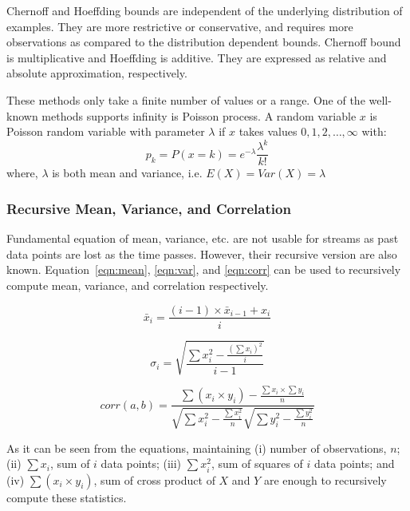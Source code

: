\documentclass[a4paper, 11pt, oneside]{book}
\begin{document}
Chernoff and Hoeffding bounds are independent of the underlying distribution of examples. They are more restrictive or conservative, and requires more observations as compared to the distribution dependent bounds. Chernoff bound is multiplicative and Hoeffding is additive. They are expressed as relative and absolute approximation, respectively.

These methods only take a finite number of values or a range. One of the well-known methods supports infinity is Poisson process. A random variable $x$ is Poisson random variable with parameter $\lambda$ if $x$ takes values $0,1,2, \dots, \infty$ with:
    \[
        p_k = P(x=k) = e^{-\lambda} \frac{\lambda^k}{k!}
    \]
    where, $\lambda$ is both mean and variance, i.e. $E(X) = Var(X) = \lambda$
    
\subsubsection{Recursive Mean, Variance, and Correlation}
Fundamental equation of mean, variance, etc. are not usable for streams as past data points are lost as the time passes. However, their recursive version are also known. Equation~\ref{eqn:mean}, \ref{eqn:var}, and \ref{eqn:corr} can be used to recursively compute mean, variance, and correlation respectively.

\begin{equation}
\label{eqn:mean}
    \bar{x}_i = \frac{(i-1) \times \bar{x}_{i-1} + x_i}{i}
\end{equation}

\begin{equation}
\label{eqn:var}
    \sigma_i = \sqrt{ \frac{\sum x_i^2 - \frac{ (\sum x_i )^2}{i} }{i-1} }
\end{equation}

\begin{equation}
\label{eqn:corr}
    corr(a, b) = \frac{ \sum(x_i \times y_i) - \frac{\sum x_i \times \sum y_i}{n} }{\sqrt{\sum x_i^2 - \frac{\sum x_i^2}{n}} \sqrt{\sum y_i^2 - \frac{\sum y_i^2}{n}}}
\end{equation}

As it can be seen from the equations, maintaining (i) number of observations, $n$; (ii) $\sum x_i$, sum of $i$ data points; (iii) $\sum x_i^2$, sum of squares of $i$ data points; and (iv) $\sum (x_i \times y_i)$, sum of cross product of $X$ and $Y$ are enough to recursively compute these statistics.
\end{document}
